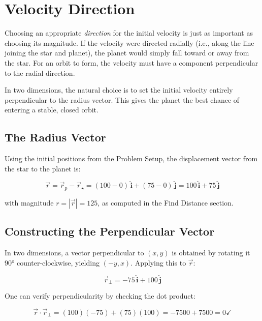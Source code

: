 \section{Velocity Direction}

Choosing an appropriate \emph{direction} for the initial velocity is just as important as choosing its magnitude. If the velocity were directed radially (i.e., along the line joining the star and planet), the planet would simply fall toward or away from the star. For an orbit to form, the velocity must have a component perpendicular to the radial direction.

In two dimensions, the natural choice is to set the initial velocity entirely perpendicular to the radius vector. This gives the planet the best chance of entering a stable, closed orbit.

\subsection{The Radius Vector}

Using the initial positions from the Problem Setup, the displacement vector from the star to the planet is:

\begin{equation}
\vec{r} = \vec{r}_p - \vec{r}_\star = (100 - 0)\,\hat{\mathbf{i}} + (75 - 0)\,\hat{\mathbf{j}} = 100\,\hat{\mathbf{i}} + 75\,\hat{\mathbf{j}}
\end{equation}

with magnitude $r = |\vec{r}| = 125$, as computed in the Find Distance section.

\subsection{Constructing the Perpendicular Vector}

In two dimensions, a vector perpendicular to $(x, y)$ is obtained by rotating it $90°$ counter-clockwise, yielding $(-y, x)$. Applying this to $\vec{r}$:

\begin{equation}
\vec{r}_\perp = -75\,\hat{\mathbf{i}} + 100\,\hat{\mathbf{j}}
\end{equation}

One can verify perpendicularity by checking the dot product:

\begin{equation}
\vec{r} \cdot \vec{r}_\perp = (100)(-75) + (75)(100) = -7500 + 7500 = 0 \checkmark
\end{equation}

